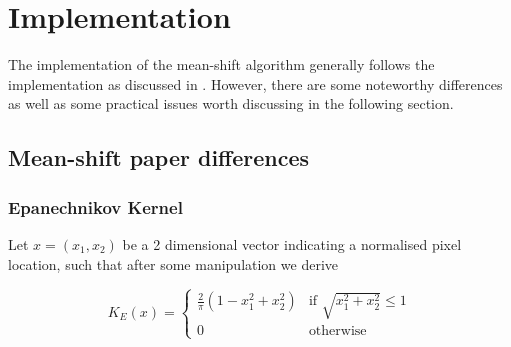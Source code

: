\documentclass[a4paper,11pt]{article}
\begin{document}
	
















\section{Implementation}

The implementation of the mean-shift algorithm generally follows the implementation as discussed in \cite{mean_shift}. However, there are some noteworthy differences as well as some practical issues worth discussing in the following section.



\subsection{Mean-shift paper differences}

\subsubsection{Epanechnikov Kernel}



Let $x = (x_1,x_2)$ be a 2 dimensional vector indicating a normalised pixel location, such that after some manipulation we derive

\begin{equation}
\label{eq:epanechnikov_kernel2}
K_E(x) = \left\{ \begin{array}{cl}
  \frac{2}{\pi} (1-x_1^2 + x_2^2) & \textrm{if } \sqrt{x_1^2 + x_2^2} \leq 1 \\
  0 & \textrm{otherwise} \end{array}\right.
\end{equation}
\end{document}
